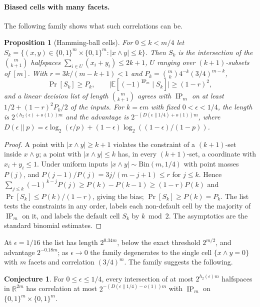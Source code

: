 \documentclass[11pt]{article}
\newtheorem{proposition}[theorem]{Proposition}
\theoremstyle{definition}
\newtheorem{conjecture}[theorem]{Conjecture}
\newcommand{\bits}{\{0,1\}}
\newcommand{\R}{\mathbb R}
\newcommand{\ip}{\operatorname{IP}}
\begin{document}
\paragraph{Biased cells with many facets.}
The following family shows what such correlations can be.

\begin{proposition}[Hamming-ball cells]\label{prop:ball_cells}
For \(0\le k<m/4\) let \(S_k=\{(x,y)\in\bits^m\times\bits^m:|x\wedge y|\le k\}\). Then \(S_k\) is the intersection of the \(\binom m{k+1}\) halfspaces \(\sum_{i\in U}(x_i+y_i)\le2k+1\), \(U\) ranging over \((k+1)\)-subsets of \([m]\). With \(r=3k/(m-k+1)<1\) and \(P_k=\binom mk4^{-k}(3/4)^{m-k}\),
\[
 \Pr[S_k]\ge P_k,\qquad
 \bigl|\mathbb E[(-1)^{\ip_m}\mid S_k]\bigr|\ge(1-r)^2,
\]
and a linear decision list of length \(\binom m{k+1}\) agrees with \(\ip_m\) on at least \(1/2+(1-r)^2P_k/2\) of the inputs. For \(k=\epsilon m\) with fixed \(0<\epsilon<1/4\), the length is \(2^{(h_2(\epsilon)+o(1))m}\) and the advantage is \(2^{-(D(\epsilon\|1/4)+o(1))m}\), where \(D(\epsilon\|p)=\epsilon\log_2(\epsilon/p)+(1-\epsilon)\log_2((1-\epsilon)/(1-p))\).
\end{proposition}
\begin{proof}
A point with \(|x\wedge y|\ge k+1\) violates the constraint of a \((k+1)\)-set inside \(x\wedge y\); a point with \(|x\wedge y|\le k\) has, in every \((k+1)\)-set, a coordinate with \(x_i+y_i\le1\). Under uniform inputs \(|x\wedge y|\sim\mathrm{Bin}(m,1/4)\) with point masses \(P(j)\), and \(P(j-1)/P(j)=3j/(m-j+1)\le r\) for \(j\le k\). Hence \(\sum_{j\le k}(-1)^{k-j}P(j)\ge P(k)-P(k-1)\ge(1-r)P(k)\) and \(\Pr[S_k]\le P(k)/(1-r)\), giving the bias; \(\Pr[S_k]\ge P(k)=P_k\). The list tests the constraints in any order, labels each non-default cell by the majority of \(\ip_m\) on it, and labels the default cell \(S_k\) by \(k\bmod2\). The asymptotics are the standard binomial estimates.
\end{proof}

At \(\epsilon=1/16\) the list has length \(2^{0.34m}\), below the exact threshold \(2^{m/2}\), and advantage \(2^{-0.18m}\); as \(\epsilon\to0\) the family degenerates to the single cell \(\{x\wedge y=0\}\) with \(m\) facets and correlation \((3/4)^m\). The family suggests the following.

\begin{conjecture}\label{conj:polytope_corr}
For \(0\le\epsilon\le1/4\), every intersection of at most \(2^{h_2(\epsilon)m}\) halfspaces in \(\R^{2m}\) has correlation at most \(2^{-(D(\epsilon\|1/4)-o(1))m}\) with \(\ip_m\) on \(\bits^m\times\bits^m\).
\end{conjecture}
\end{document}
